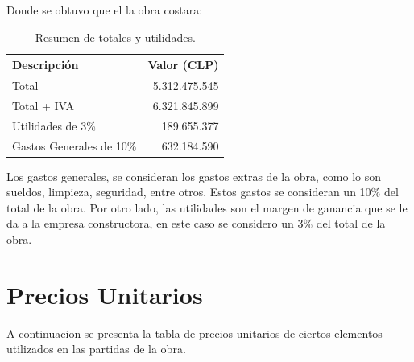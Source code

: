 \documentclass{article} %
\begin{document}
    
Donde se obtuvo que el la obra costara:

\begin{table}[H]
    \centering
    \begin{tabular}{|l|r|}
    \hline
    \textbf{Descripción}      & \textbf{Valor (CLP)} \\ \hline
    Total                     & 5.312.475.545       \\ \hline
    Total + IVA               & 6.321.845.899       \\ \hline
    Utilidades de 3\%         & 189.655.377         \\ \hline
    Gastos Generales de 10\%  & 632.184.590         \\ \hline
    \end{tabular}
    \caption{Resumen de totales y utilidades.}
    \label{tabla-totales-utilidades}
\end{table}


Los gastos generales, se consideran los gastos extras de la obra, como lo son sueldos, limpieza, seguridad, entre otros. Estos gastos se consideran un 10\% del total de la obra. Por otro lado, las utilidades son el margen de ganancia que se le da a la empresa constructora, en este caso se considero un 3\% del total de la obra.

\newpage
\section{Precios Unitarios}

A continuacion se presenta la tabla de precios unitarios de ciertos elementos utilizados en las partidas de la obra.
\end{document}

